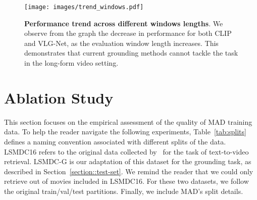 \documentclass[10pt,twocolumn,letterpaper]{article}
\begin{document}
\begin{figure}[t]
    \centering
        \texttt{[image: images/trend\_windows.pdf]}
        
        \vspace{-0.2cm}
        \caption{\textbf{Performance trend across different windows lengths}. 
         We observe from the graph the decrease in performance for both CLIP and VLG-Net, as the evaluation window length increases. This demonstrates that current grounding methods cannot tackle the task in the long-form video setting. 
        \vspace{-0.3cm}
    }
    \label{fig:trend_windows}
\end{figure}  
\section{Ablation Study}\label{sec:analysis}
This section focuses on the empirical assessment of the quality of MAD training data.
To help the reader navigate the following experiments, Table~\ref{tab:splits} defines a naming convention associated with different splits of the data. LSMDC16 refers to the original data collected  by~\cite{rohrbach2015dataset,torabi2015using,rohrbach2017movie} for the task of text-to-video retrieval. LSMDC-G is our adaptation of this dataset for the grounding task, as described in Section~\ref{section::test-set}. 
We remind the reader that we could only retrieve  out of  movies included in LSMDC16. 
For these two datasets, we follow the original train/val/test partitions. Finally, we include MAD's split details. 

\begin{table}[!t]
    \centering
\setlength{\tabcolsep}{2pt}
\renewcommand{\arraystretch}{1} 
\vspace{-.1cm}
\caption{\label{tab:splits}{\bf Data split cheat-sheet.}  
    This table clarifies the data splits used in the following experiments (Table~\ref{tab:ablation_grounding} and Table~\ref{tab:ablation_retrieval}). LSMDC16~\cite{rohrbach2017movie} is the original data collected for retrieval. LSMDC-G is our adaptation to the grounding task. MAD is our proposed dataset. 
}
\vspace{-.5cm}
 \end{table}
\end{document}
